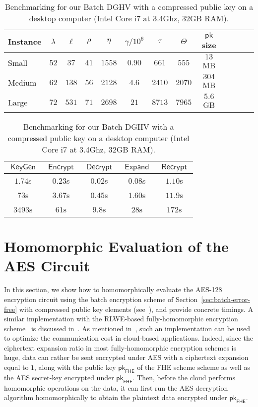 \documentclass[11pt]{llncs}
\DeclareMathOperator{\KeyGen}{\ensuremath{\mathsf{KeyGen}}}
\DeclareMathOperator{\Expand}{\ensuremath{\mathsf{Expand}}}
\DeclareMathOperator{\Encrypt}{\ensuremath{\mathsf{Encrypt}}}
\DeclareMathOperator{\Decrypt}{\ensuremath{\mathsf{Decrypt}}}
\DeclareMathOperator{\Recrypt}{\ensuremath{\mathsf{Recrypt}}}
\DeclareMathOperator{\Mult}{\ensuremath{\mathsf{Mult}}}
\newcommand*{\pk}{\ensuremath{\mathsf{pk}}}
\newcommand*{\FHE}{\ensuremath{\mathsf{FHE}}}
\begin{document}
\begin{table}[tb]\scriptsize\centering

\caption{Benchmarking for our Batch DGHV with a compressed public key
  on a desktop computer (Intel Core i7 at 3.4Ghz, 32GB RAM).}
\label{t:concparams}
\begin{tabular}{|l|c|c||c|c|c|c|c|c|c|c|c||r|}
\hline 
\textbf{Instance}&$\lambda$&$\ell$&$\rho$&$\eta$&$\gamma/ 10^{6}$&$\tau$&$\Theta$&$\pk$ size\\
\hline
\hline
Small&$52$&$37$&$41$&$1558$&$0.90$&$661$&$555$&$13$ MB\\\hline
Medium&$62$&$138$&$56$&$2128$&$4.6$&$2410$&$2070$&$304$ MB\\\hline
Large&$72$&$531$&$71$&$2698$&$21$&$8713$&$7965$&$5.6$ GB\\\hline
\end{tabular}\begin{tabular}{||c|c|c|c|c|}
\hline 
$\KeyGen$&$\Encrypt$&$\Decrypt$&
$\Expand$ & $\Recrypt$\\
\hline
\hline
$1.74$s&$0.23$s&$0.02$s&
$0.08$s&$1.10$s\\\hline
$73$s&$3.67$s&$0.45$s&
$1.60$s&$11.9$s\\\hline
$3493$s&$61$s&$9.8$s&
$28$s&$172$s\\\hline
\end{tabular}
\end{table}


\section{Homomorphic Evaluation of the AES Circuit}
\label{sec:HAES}

In this section, we show how to homomorphically evaluate the AES-128
encryption circuit using the batch encryption scheme of Section~\ref{sec:batch-error-free} with compressed public key elements (see~\cite{CLT2013a}), and provide
concrete timings. A similar
implementation with
 the RLWE-based 
fully-homomorphic encryption scheme~\cite{BV2011a,BV2011b,GHS2012a} is
discussed in~\cite{GHS2012c}. 
As mentioned 
in~\cite{SV2011,NLV2011,GHS2012c}, such an implementation can be used to
optimize the communication cost in cloud-based
applications. Indeed, since the ciphertext expansion ratio in most
fully-homomorphic encryption schemes is huge, data can rather be sent
encrypted under AES with a ciphertext expansion equal to $1$, along
with the public key $\pk_{\FHE}$ of the FHE scheme scheme as well as
the AES secret-key 
encrypted under $\pk_{\FHE}$. Then, before the cloud performs homomorphic operations
on the data, it can first run the AES decryption algorithm
homomorphically to obtain the plaintext data encrypted under
$\pk_{\FHE}$.
\end{document}

